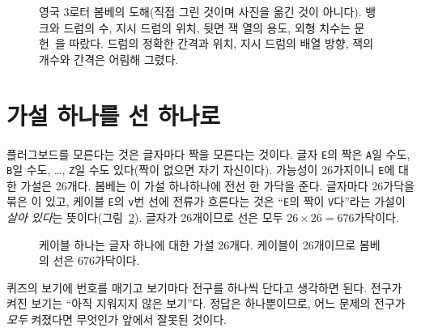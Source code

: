\begin{figure}[p]
\centering

\caption{영국 3로터 봄베의 도해(직접 그린 것이며 사진을 옮긴 것이 아니다). 뱅크와 드럼의 수, 지시 드럼의
위치, 뒷면 잭 열의 용도, 외형 치수는 문헌~\cite{us6812report1944,ellsbury1998bombe,jackson-bh10}을
따랐다. 드럼의 정확한 간격과 위치, 지시 드럼의 배열 방향, 잭의 개수와 간격은 어림해 그렸다.}
\label{fig:g-bombe-front}
\end{figure}

\section{가설 하나를 선 하나로}\label{sec:c-wire}

\Why 플러그보드를 모른다는 것은 글자마다 짝을 모른다는 것이다. 글자 \texttt{E}의 짝은 \texttt{A}일 수도,
\texttt{B}일 수도, \ldots, \texttt{Z}일 수도 있다(짝이 없으면 자기 자신이다). 가능성이 26가지이니 \texttt{E}에
대한 가설은 26개다. 봄베는 이 가설 하나하나에 전선 한 가닥을 준다. 글자마다 26가닥을 묶은
이 있고, 케이블 \texttt{E}의 \texttt{v}번 선에 전류가 흐른다는 것은 ``\texttt{E}의 짝이
\texttt{V}다''라는 가설이 \emph{살아 있다}는 뜻이다(그림~\ref{fig:c-cable}). 글자가 26개이므로 선은 모두
$26 \times 26 = 676$가닥이다.

\begin{figure}[ht]
\centering
{}
\caption{케이블 하나는 글자 하나에 대한 가설 26개다. 케이블이 26개이므로 봄베의 선은 676가닥이다.}
\label{fig:c-cable}
\end{figure}

\General 퀴즈의 보기에 번호를 매기고 보기마다 전구를 하나씩 단다고 생각하면 된다. 전구가 켜진 보기는 ``아직
지워지지 않은 보기''다. 정답은 하나뿐이므로, 어느 문제의 전구가 \emph{모두} 켜졌다면 무엇인가 앞에서 잘못된
것이다.

